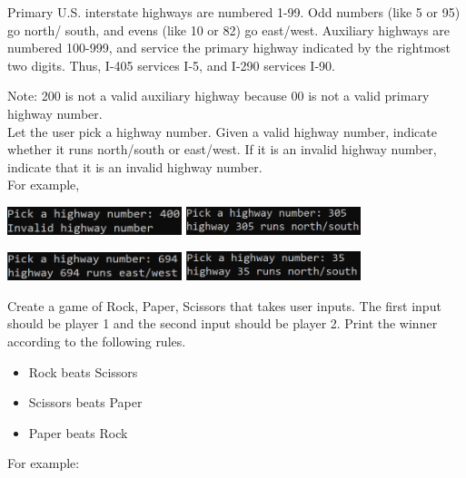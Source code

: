 	
	\item  
		Primary U.S. interstate highways are numbered 1-99.  Odd numbers (like 5 or 95) go north/
		south, and evens (like 10 or 82) go east/west.  Auxiliary highways are numbered 100-999, and 
		service the primary highway indicated by the rightmost two digits.  Thus, I-405 services 
		I-5, and I-290 services I-90.
		
		Note: 200 is not a valid auxiliary highway because 00 is not a valid primary highway 
		number.\\
		
		Let the user pick a highway number.  Given a valid highway number, indicate whether it runs 
		north/south or east/west.  If it is an invalid highway number, indicate that it is an 
		invalid highway number. \\
		For example,
		
		\hfill
		\includegraphics[width = 2in]{./imgs/highwayValidator1.PNG} \hfill
		\includegraphics[width = 2in]{./imgs/highwayValidator2.PNG} \hfill \ 

		\hfill 
		\includegraphics[width = 2in]{./imgs/highwayValidator3.PNG} \hfill 
		\includegraphics[width = 2in]{./imgs/highwayValidator4.PNG} \hfill \ 



	\item  
		Create a game of Rock, Paper, Scissors that takes user inputs.  
		The first input should be player 1 and the second 
		input should be player 2.  Print the winner according to the following rules. 
		\begin{itemize}
			\item Rock beats Scissors
			\item Scissors beats Paper
			\item Paper beats Rock
		\end{itemize}		
		For example:

